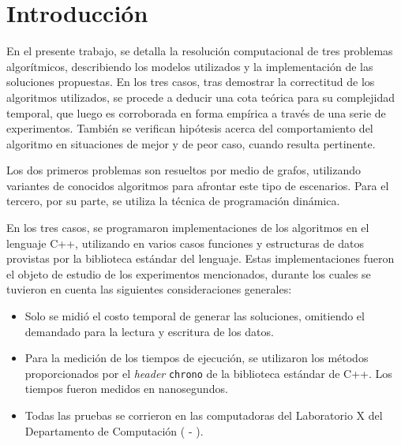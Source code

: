 \section{Introducción}
    En el presente trabajo, se detalla la resolución computacional de tres
    problemas algorítmicos, describiendo los modelos utilizados y la
    implementación de las soluciones propuestas. En los tres casos, tras
    demostrar la correctitud de los algoritmos utilizados, se procede a
    deducir una cota teórica para su complejidad temporal, que luego es
    corroborada en forma empírica a través de una serie de experimentos.
    También se verifican hipótesis acerca del comportamiento del algoritmo
    en situaciones de mejor y de peor caso, cuando resulta pertinente.

    Los dos primeros problemas son resueltos por medio de grafos, utilizando
    variantes de conocidos algoritmos para afrontar este tipo de escenarios.
    Para el tercero, por su parte, se utiliza la técnica de programación
    dinámica.

    En los tres casos, se programaron implementaciones de los algoritmos
    en el lenguaje C++, utilizando en varios casos funciones y
    estructuras de datos provistas por la biblioteca estándar del lenguaje.
    Estas implementaciones fueron el objeto de estudio de los experimentos
    mencionados, durante los cuales se tuvieron en cuenta las siguientes
    consideraciones generales:

    \begin{itemize}
    \item Solo se midió el costo temporal de generar las soluciones,
    omitiendo el demandado para la lectura y escritura de los datos.
    \item Para la medición de los tiempos de ejecución, se utilizaron los
    métodos proporcionados por el \emph{header} \texttt{chrono} de la
    biblioteca estándar de C++. Los tiempos fueron medidos en nanosegundos.
    \item Todas las pruebas se corrieron en las computadoras del Laboratorio X
    del Departamento de Computación ( - ).
    \end{itemize}
